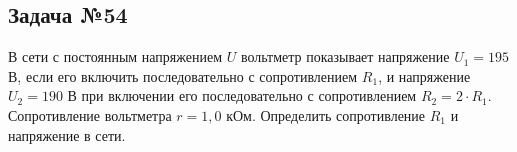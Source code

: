 \subsection{Задача №54}

В сети с постоянным напряжением $U$ вольтметр показывает напряжение $U_1 = 195$ В, если его включить последовательно с сопротивлением $R_1$, и напряжение $U_2 = 190$ В при включении его последовательно с сопротивлением $R_2 = 2\cdot R_1$. Сопротивление вольтметра $r = 1,0$ кОм. Определить сопротивление $R_1$ и напряжение в сети.